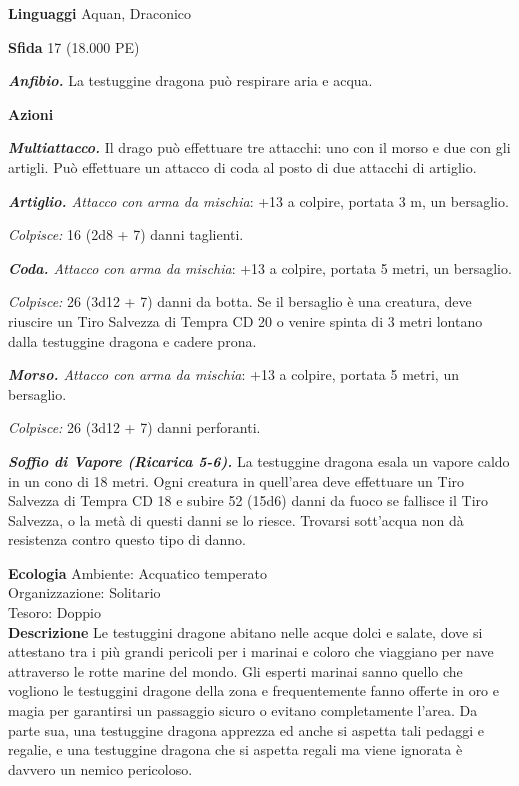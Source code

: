 \begin{multicols}{2}
\textbf{Linguaggi} Aquan, Draconico

\textbf{Sfida} 17 (18.000 PE)

\emph{\textbf{Anfibio.}} La testuggine dragona può respirare aria e acqua.

\textbf{Azioni}

\emph{\textbf{Multiattacco.}} Il drago può effettuare tre attacchi: uno con il morso e due con gli artigli. Può effettuare un attacco di coda al posto di due attacchi di artiglio.

\emph{\textbf{Artiglio.} Attacco con arma da mischia}: +13 a colpire, portata 3 m, un bersaglio.

\emph{Colpisce:} 16 (2d8 + 7) danni taglienti.

\emph{\textbf{Coda.} Attacco con arma da mischia}: +13 a colpire, portata 5 metri, un bersaglio.

\emph{Colpisce:} 26 (3d12 + 7) danni da botta. Se il bersaglio è una creatura, deve riuscire un Tiro Salvezza di Tempra CD 20 o venire spinta di 3 metri lontano dalla testuggine dragona e cadere prona.

\emph{\textbf{Morso.} Attacco con arma da mischia}: +13 a colpire, portata 5 metri, un bersaglio.

\emph{Colpisce:} 26 (3d12 + 7) danni perforanti.

\emph{\textbf{Soffio di Vapore (Ricarica 5-6).}} La testuggine dragona esala un vapore caldo in un cono di 18 metri. Ogni creatura in quell'area deve effettuare un Tiro Salvezza di Tempra CD 18 e subire 52 (15d6) danni da fuoco se fallisce il Tiro Salvezza, o la metà di questi danni se lo riesce. Trovarsi sott'acqua non dà resistenza contro questo tipo di danno.

\textbf{Ecologia}
Ambiente: Acquatico temperato\\
Organizzazione: Solitario\\
Tesoro: Doppio\\
\textbf{Descrizione}
Le testuggini dragone abitano nelle acque dolci e salate, dove si attestano tra i più grandi pericoli per i marinai e coloro che viaggiano per nave attraverso le rotte marine del mondo. Gli esperti marinai sanno quello che vogliono le testuggini dragone della zona e frequentemente fanno offerte in oro e magia per garantirsi un passaggio sicuro o evitano completamente l'area. Da parte sua, una testuggine dragona apprezza ed anche si aspetta tali pedaggi e regalie, e una testuggine dragona che si aspetta regali ma viene ignorata è davvero un nemico pericoloso.\\


\end{multicols}
